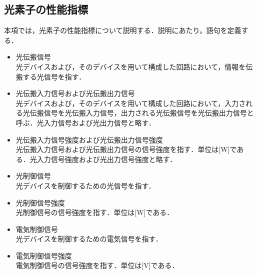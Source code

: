 \subsection{光素子の性能指標}
本項では，光素子の性能指標について説明する．説明にあたり，語句を定義する．
\begin{itemize}
\item 光伝搬信号\\
光デバイスおよび，そのデバイスを用いて構成した回路において，情報を伝搬する光信号を指す．
\item 光伝搬入力信号および光伝搬出力信号\\
光デバイスおよび，そのデバイスを用いて構成した回路において，入力される光伝搬信号を光伝搬入力信号，出力される光伝搬信号を光伝搬出力信号と呼ぶ．光入力信号および光出力信号と略す．
\item 光伝搬入力信号強度および光伝搬出力信号強度\\
光伝搬入力信号および光伝搬出力信号の信号強度を指す．単位は[W]である．光入力信号強度および光出力信号強度と略す．
\item 光制御信号\\
光デバイスを制御するための光信号を指す．
\item 光制御信号強度\\
光制御信号の信号強度を指す．単位は[W]である．
\item 電気制御信号\\
光デバイスを制御するための電気信号を指す．
\item 電気制御信号強度\\
電気制御信号の信号強度を指す．単位は[V]である．
\end{itemize}

